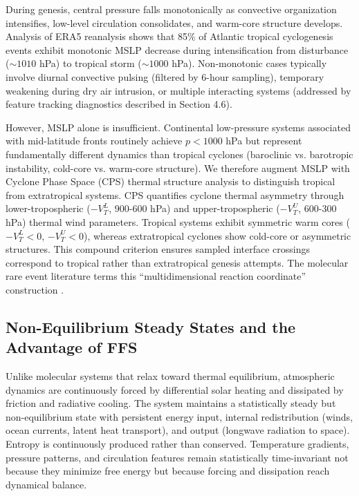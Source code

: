 \documentclass[11pt]{article}
\begin{document}
During genesis, central pressure falls monotonically as convective organization intensifies, low-level circulation consolidates, and warm-core structure develops. Analysis of ERA5 reanalysis shows that 85\% of Atlantic tropical cyclogenesis events exhibit monotonic MSLP decrease during intensification from disturbance ($\sim 1010$ hPa) to tropical storm ($\sim 1000$ hPa). Non-monotonic cases typically involve diurnal convective pulsing (filtered by 6-hour sampling), temporary weakening during dry air intrusion, or multiple interacting systems (addressed by feature tracking diagnostics described in Section 4.6).

However, MSLP alone is insufficient. Continental low-pressure systems associated with mid-latitude fronts routinely achieve $p < 1000$ hPa but represent fundamentally different dynamics than tropical cyclones (baroclinic vs. barotropic instability, cold-core vs. warm-core structure). We therefore augment MSLP with Cyclone Phase Space (CPS) thermal structure analysis to distinguish tropical from extratropical systems. CPS quantifies cyclone thermal asymmetry through lower-tropospheric ($-V_T^L$, 900-600 hPa) and upper-tropospheric ($-V_T^U$, 600-300 hPa) thermal wind parameters. Tropical systems exhibit symmetric warm cores ($-V_T^L < 0$, $-V_T^U < 0$), whereas extratropical cyclones show cold-core or asymmetric structures. This compound criterion ensures sampled interface crossings correspond to tropical rather than extratropical genesis attempts. The molecular rare event literature terms this ``multidimensional reaction coordinate'' construction \citep{defever2019contour}.

\subsection{Non-Equilibrium Steady States and the Advantage of FFS}

Unlike molecular systems that relax toward thermal equilibrium, atmospheric dynamics are continuously forced by differential solar heating and dissipated by friction and radiative cooling. The system maintains a statistically steady but non-equilibrium state with persistent energy input, internal redistribution (winds, ocean currents, latent heat transport), and output (longwave radiation to space). Entropy is continuously produced rather than conserved. Temperature gradients, pressure patterns, and circulation features remain statistically time-invariant not because they minimize free energy but because forcing and dissipation reach dynamical balance.
\end{document}
